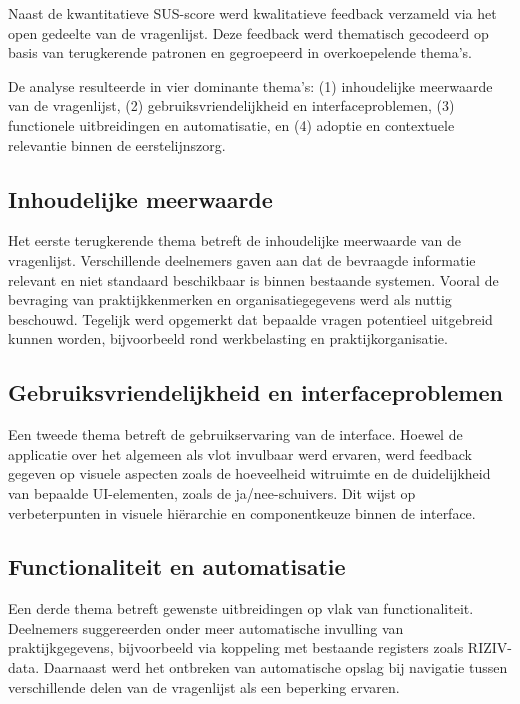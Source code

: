 Naast de kwantitatieve SUS-score werd kwalitatieve feedback verzameld via het open gedeelte van de vragenlijst. 
Deze feedback werd thematisch gecodeerd op basis van terugkerende patronen en gegroepeerd in overkoepelende thema's.
\medskip

De analyse resulteerde in vier dominante thema's: (1) inhoudelijke meerwaarde van de vragenlijst, (2) gebruiksvriendelijkheid en interfaceproblemen, (3) functionele uitbreidingen en automatisatie, en (4) adoptie en contextuele relevantie binnen de eerstelijnszorg.

\subsection{Inhoudelijke meerwaarde}
\label{subsec:inhoudelijkeMeerwaarde}

Het eerste terugkerende thema betreft de inhoudelijke meerwaarde van de vragenlijst. 
Verschillende deelnemers gaven aan dat de bevraagde informatie relevant en niet standaard beschikbaar is binnen bestaande systemen. 
Vooral de bevraging van praktijkkenmerken en organisatiegegevens werd als nuttig beschouwd. 
Tegelijk werd opgemerkt dat bepaalde vragen potentieel uitgebreid kunnen worden, bijvoorbeeld rond werkbelasting en praktijkorganisatie.

\subsection{Gebruiksvriendelijkheid en interfaceproblemen}
\label{subsec:gebruiksvriendelijkheidinterfaceproblemen}

Een tweede thema betreft de gebruikservaring van de interface. 
Hoewel de applicatie over het algemeen als vlot invulbaar werd ervaren, werd feedback gegeven op visuele aspecten zoals de hoeveelheid witruimte en de duidelijkheid van bepaalde UI-elementen, zoals de ja/nee-schuivers. 
Dit wijst op verbeterpunten in visuele hiërarchie en componentkeuze binnen de interface.


\subsection{Functionaliteit en automatisatie}
\label{subsec:functionaliteitAutomatisatie}

Een derde thema betreft gewenste uitbreidingen op vlak van functionaliteit. 
Deelnemers suggereerden onder meer automatische invulling van praktijkgegevens, bijvoorbeeld via koppeling met bestaande registers zoals RIZIV-data. 
Daarnaast werd het ontbreken van automatische opslag bij navigatie tussen verschillende delen van de vragenlijst als een beperking ervaren.

